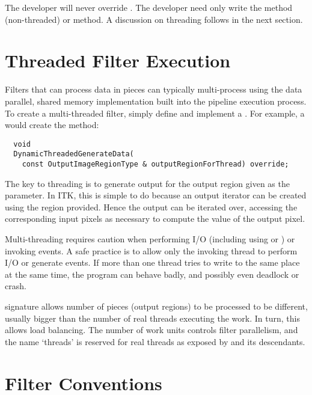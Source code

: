 The developer will never override . The developer need
only write the  method (non-threaded) or
 method. A discussion on threading follows in the
next section.


\section{Threaded Filter Execution}
\label{sec:ThreadedFilterExecution}

Filters that can process data in pieces can typically multi-process
using the data parallel, shared memory implementation built into the
pipeline execution process. To create a multi-threaded filter, simply
define and implement a .
For example, a  would create the method:

\small
\begin{verbatim}
  void
  DynamicThreadedGenerateData(
    const OutputImageRegionType & outputRegionForThread) override;
\end{verbatim}
\normalsize

The key to threading is to generate output for the output region given as
the parameter. In ITK, this is simple to do
because an output iterator can be created using the region provided. Hence
the output can be iterated over, accessing the corresponding input pixels as
necessary to compute the value of the output pixel.

Multi-threading requires caution when performing I/O (including using
 or ) or invoking events. A safe practice is to allow
only the invoking thread to perform I/O or generate events.
If more than one thread tries to write to the same place at the same time,
the program can behave badly, and possibly even deadlock or crash.

 signature allows number of pieces
(output regions) to be processed to be different, usually bigger than the
number of real threads executing the work. In turn, this allows load
balancing. The number of work units controls filter parallelism,
and the name `threads' is reserved for real threads as exposed by
 and its descendants.



\section{Filter Conventions}

